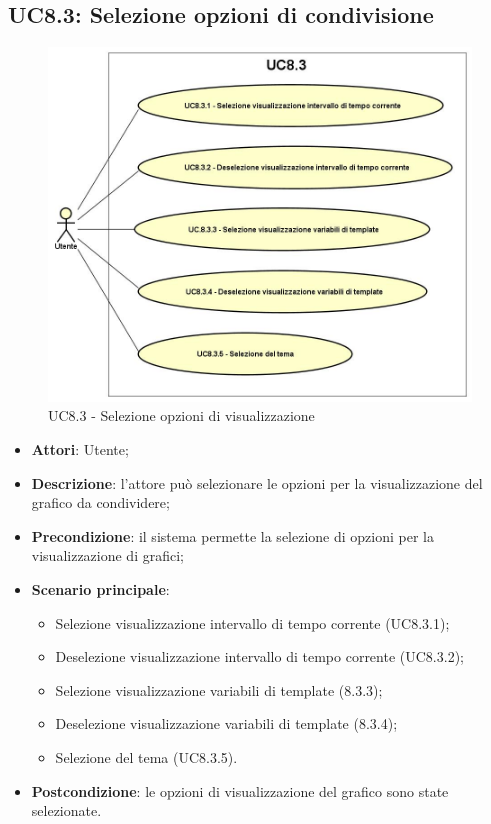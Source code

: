 \subsection{UC8.3: Selezione opzioni di condivisione}
\hypertarget{UC8.3}{}
\begin{figure} [H]
	\centering
	\includegraphics[scale=0.45]{Img/UC8-3}
	\caption{UC8.3 - Selezione opzioni di visualizzazione}\label{}
\end{figure}
\begin{itemize}
	\item \textbf{Attori}: Utente;
	\item \textbf{Descrizione}: l'attore può selezionare le opzioni per la visualizzazione del grafico da condividere;
	\item \textbf{Precondizione}: il sistema permette la selezione di opzioni per la visualizzazione di grafici;
	\item \textbf{Scenario principale}:
	\begin{itemize}
		\item Selezione visualizzazione intervallo di tempo corrente (UC8.3.1);
		\item Deselezione visualizzazione intervallo di tempo corrente (UC8.3.2);
		\item Selezione visualizzazione variabili di template (8.3.3);
		\item Deselezione visualizzazione variabili di template (8.3.4);
		\item Selezione del tema (UC8.3.5).
	\end{itemize}
	\item \textbf{Postcondizione}: le opzioni di visualizzazione del grafico sono state selezionate.
\end{itemize}

